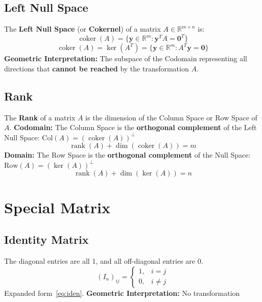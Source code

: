 \documentclass{article}
\begin{document}
\subsection{Left Null Space}
The \textbf{Left Null Space} (or \textbf{Cokernel}) of a matrix $A \in \mathbb{R}^{m \times n}$ is:
\[
    \operatorname{coker}(A) = \{ \mathbf{y} \in \mathbb{R}^m : \mathbf{y}^T A = \mathbf{0}^T \}
\]
\[
    \operatorname{coker}(A) = \ker(A^T) = \{ \mathbf{y} \in \mathbb{R}^m : A^T \mathbf{y} = \mathbf{0} \}
\]
\textbf{Geometric Interpretation:} The subspace of the Codomain representing all directions that \textbf{cannot be reached} by the transformation $A$.

\subsection{Rank}
The \textbf{Rank} of a matrix $A$ is the dimension of the Column Space or Row Space of $A$.
\newline
\textbf{Codomain:}
\newline
The Column Space is the \textbf{orthogonal complement} of the Left Null Space: $\text{Col}(A) = (\operatorname{coker}(A))^{\perp}$
\[
    \operatorname{rank}(A) + \dim(\operatorname{coker}(A)) = m
\]
\textbf{Domain:}
\newline
The Row Space is the \textbf{orthogonal complement} of the Null Space: $\text{Row}(A) = (\ker(A))^{\perp}$
\[
    \operatorname{rank}(A) + \dim(\ker(A)) = n
\]


\newpage
\section{Special Matrix}

\subsection{Identity Matrix}
The diagonal entries are all 1, and all off-diagonal entries are 0.
\[
    (I_n)_{ij} =
    \begin{cases}
        1, & i = j \\
        0, & i \neq j
    \end{cases}
\]
Expanded form~\ref{eq:iden}.
\newline
\textbf{Geometric Interpretation:} No transformation
\end{document}
